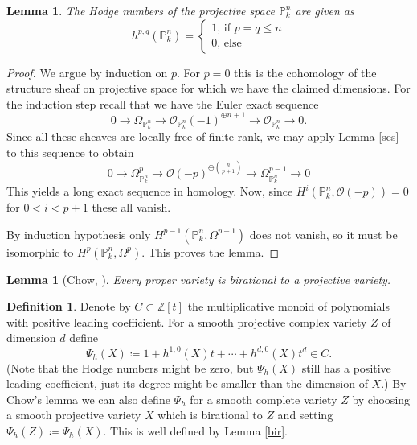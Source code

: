 \documentclass[11pt, a4paper, english, twoside]{article}
\theoremstyle{plain}
\newtheorem{lemma}[theorem]{Lemma}
\theoremstyle{definition}
\newtheorem{definition}[theorem]{Definition}
\begin{document}
\begin{lemma}
    The Hodge numbers of the projective space $\mathbb{P}_k^n$ are given as
    \[
        h^{p,q}(\mathbb{P}_k^n) = 
        \begin{cases}
            1 \text{, if $p = q \leq n$}\\
            0 \text{, else}
        \end{cases}
    \]
\end{lemma}
\begin{proof}
    We argue by induction on $p$. 
    For $p = 0$ this is the cohomology of the structure sheaf on projective space for which we have the claimed dimensions.
    For the induction step recall that we have the Euler exact sequence 
    \[0 \to \Omega_{\mathbb{P}_k^n} \to {\mathcal{O}_{\mathbb{P}_k^n}(-1)}^{\oplus n+1} \to \mathcal{O}_{\mathbb{P}_k^n} \to 0 .\]
    Since all these sheaves are locally free of finite rank, we may apply Lemma \ref{ses} to this sequence to obtain
    \[
        0 \to \Omega_{\mathbb{P}_k^n}^p \to {\mathcal{O}(-p)}^{\oplus \binom{n}{p+1}} \to \Omega_{\mathbb{P}_k^n}^{p-1} \to 0
    \]
    This yields a long exact sequence in homology. Now, since $H^i(\mathbb{P}_k^n, \mathcal{O}(-p)) = 0$ for $0 < i < p+1$ these all vanish.

    By induction hypothesis only $H^{p-1}(\mathbb{P}_k^n, \Omega^{p-1})$ does not vanish, so it must be isomorphic to 
    $H^{p}(\mathbb{P}_k^n, \Omega^p)$. This proves the lemma.
\end{proof}
\begin{lemma}[Chow, {\cite[II Ex. 4.10]{Ha}}]
    Every proper variety is birational to a projective variety.
\end{lemma}


\begin{definition}
    Denote by $C \subset \mathbb{Z}[t]$ the multiplicative monoid of polynomials with positive leading coefficient.
    For a smooth projective complex variety $Z$ of dimension $d$ define
    \[
        \Psi_h(X) \coloneqq1 + h^{1,0}(X)t + \cdots + h^{d,0}(X)t^d \in C.
    \]
    (Note that the Hodge numbers might be zero, but $\Psi_h(X)$ still has a positive leading coefficient, 
    just its degree might be smaller than the dimension of $X$.)
    By Chow's lemma we can also define $\Psi_h$ for a smooth complete variety $Z$ by choosing a smooth projective variety $X$ which is birational
    to $Z$ and setting $\Psi_h(Z) \coloneqq \Psi_h(X)$. This is well defined by Lemma \ref{bir}.
\end{definition}
\end{document}
